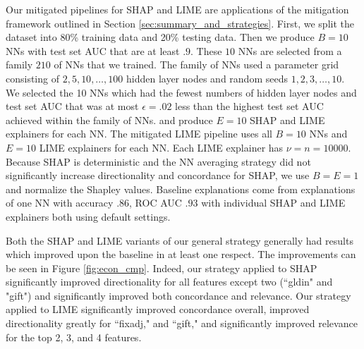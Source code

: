 \documentclass[12pt]{article}  %
\begin{document}
    Our mitigated pipelines for SHAP and LIME are applications of the mitigation framework outlined in Section \ref{sec:summary_and_strategies}. First, we split the dataset into 80\% training data and 20\% testing data. Then we produce $B=10$ NNs with test set AUC that are at least $.9$. These $10$ NNs are selected from a family $210$ of NNs that we trained. The family of NNs used a parameter grid consisting of $2,5,10,\ldots,100$ hidden layer nodes and random seeds $1,2,3,\ldots,10$. We selected the 10 NNs which had the fewest numbers of hidden layer nodes and test set AUC that was at most $\epsilon=.02$ less than the highest test set AUC achieved within the family of NNs. and produce $E=10$ SHAP and LIME explainers for each NN. The mitigated LIME pipeline uses all $B=10$ NNs and $E=10$ LIME explainers for each NN. Each LIME explainer has $\nu=n=10000$. Because SHAP is  deterministic and the NN averaging strategy did not significantly increase directionality and concordance for SHAP, we use $B=E=1$ and normalize the Shapley values. Baseline explanations come from explanations of one NN with accuracy $.86$, ROC AUC $.93$ with individual SHAP and LIME explainers both using default settings. 


    Both the SHAP and LIME variants of our general strategy generally had results which improved upon the baseline in at least one respect. The improvements can be seen in Figure \ref{fig:econ_cmp}. Indeed, our strategy applied to SHAP significantly improved directionality for all features except two (``gldin" and "gift") and significantly improved both concordance and relevance.  Our strategy applied to LIME significantly improved concordance overall, improved directionality greatly for ``fixadj," and ``gift," and significantly improved relevance for the top 2, 3, and 4 features. %

     
\end{document}
